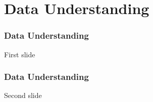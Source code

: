 \section{Data Understanding}

\begin{frame}
    \frametitle{Data Understanding}

    First slide

\end{frame}

\begin{frame}
    \frametitle{Data Understanding}

    Second slide

\end{frame}